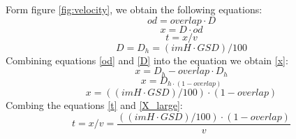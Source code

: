 Form figure \ref{fig:velocity}, we obtain the following equations:
\begin{equation}
od =overlap\cdot D
\label{od}
\end{equation}
\begin{equation}
x=D\cdot od
\label{x}
\end{equation}
\begin{equation}
t = x/v
\label{t}
\end{equation}
\begin{equation}
D=D_{h}=(imH\cdot GSD)/100
\label{D}
\end{equation}
Combining equations \ref{od} and \ref{D} into  the equation we obtain \ref{x}:
\begin{equation}
x = D_{h}-overlap\cdot D_{h}
\end{equation}
\begin{equation}
x= D_{h\cdot (1-overlap)}
\end{equation}
\begin{equation}
x = ((imH\cdot GSD)/100)\cdot (1-overlap)
\label{X_large}
\end{equation}
Combing the equations \ref{t} and \ref{X_large}:
\begin{equation}
t=x/v=\frac{((imH\cdot GSD)/100)\cdot (1-overlap)}{v}
\end{equation}
